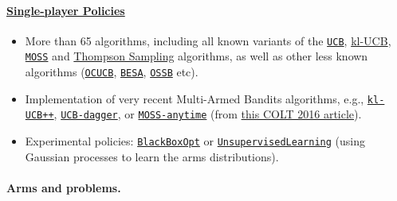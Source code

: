 \hypertarget{single-player-policies}{%
\paragraph{\texorpdfstring{\href{https://smpybandits.github.io/docs/Policies.html}{Single-player
Policies}}{Single-player Policies}}\label{single-player-policies}}

\begin{itemize}
\tightlist
\item
  More than 65 algorithms, including all known variants of the
  \href{https://smpybandits.github.io/docs/Policies.UCB.html}{\texttt{UCB}},
  \href{https://smpybandits.github.io/docs/Policies.klUCB.html}{kl-UCB},
  \href{https://smpybandits.github.io/docs/Policies.MOSS.html}{\texttt{MOSS}}
  and
  \href{https://smpybandits.github.io/docs/Policies.Thompson.html}{Thompson
  Sampling} algorithms, as well as other less known algorithms
  (\href{https://smpybandits.github.io/docs/Policies.OCUCB.html}{\texttt{OCUCB}},
  \href{https://smpybandits.github.io/docs/Policies.OCUCB.html}{\texttt{BESA}},
  \href{https://smpybandits.github.io/docs/Policies.OSSB.html}{\texttt{OSSB}}
  etc).
\item
  Implementation of very recent Multi-Armed Bandits algorithms, e.g.,
  \href{https://smpybandits.github.io/docs/Policies.klUCBPlusPlus.html}{\texttt{kl-UCB++}},
  \href{https://smpybandits.github.io/docs/Policies.UCBdagger.html}{\texttt{UCB-dagger}},
  or
  \href{https://smpybandits.github.io/docs/Policies.MOSSAnytime.html}{\texttt{MOSS-anytime}}
  (from \href{http://proceedings.mlr.press/v48/degenne16.pdf}{this COLT
  2016 article}).
\item
  Experimental policies:
  \href{https://smpybandits.github.io/docs/Policies.BlackBoxOpt.html}{\texttt{BlackBoxOpt}}
  or
  \href{https://smpybandits.github.io/docs/Policies.UnsupervisedLearning.html}{\texttt{UnsupervisedLearning}}
  (using Gaussian processes to learn the arms distributions).
\end{itemize}

\hypertarget{arms-and-problems}{%
\paragraph{Arms and problems.}\label{arms-and-problems}}

